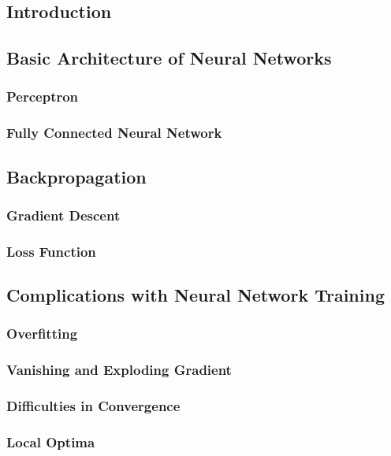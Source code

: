 \documentclass[titlepage]{article}
\begin{document}
\subsection{Introduction}

\newpage

\subsection{Basic Architecture of Neural Networks}
\subsubsection{Perceptron}
\subsubsection{Fully Connected Neural Network}

\newpage

\subsection{Backpropagation}
\subsubsection{Gradient Descent}
\subsubsection{Loss Function}

\newpage

\subsection{Complications with Neural Network Training}
\subsubsection{Overfitting}
\subsubsection{Vanishing and Exploding Gradient}
\subsubsection{Difficulties in Convergence}
\subsubsection{Local Optima}
\end{document}
